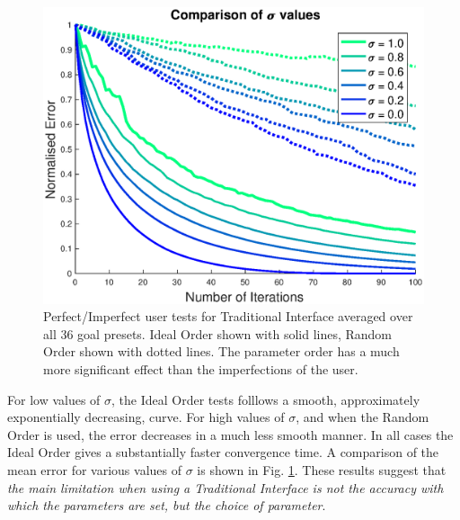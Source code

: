 \documentclass[11pt, oneside]{report}   	%
\begin{document}
\begin{figure}[h]
	\centering
	\includegraphics[width = 5in]{TradInterfaceTests2.eps}
	\caption{Perfect/Imperfect user tests for Traditional Interface averaged over all 36 goal presets. Ideal Order shown with solid lines, Random Order shown with dotted lines. The parameter order has a much more significant effect than the imperfections of the user.}
	\label{fig:TradTest2}
		\vspace{-10pt}
\end{figure}
For low values of $\sigma$, the Ideal Order tests folllows a smooth, approximately exponentially decreasing, curve. For high values of $\sigma$, and when the Random Order is used, the error decreases in a much less smooth manner. In all cases the Ideal Order gives a substantially faster convergence time. A comparison of the mean error for various values of $\sigma$ is shown in Fig. \ref{fig:TradTest2}. These results suggest that \emph{the main limitation when using a Traditional Interface is not the accuracy with which the parameters are set, but the choice of parameter}.
%
\end{document}
